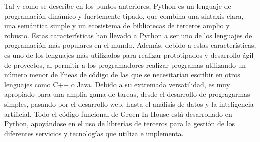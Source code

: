 Tal y como se describe en los puntos anteriores, Python es un lenguaje de programación dinámico y fuertemente tipado, que combina una sintaxis clara, una semántica simple y un ecosistema de bibliotecas de terceros amplio y robusto. Estas características han llevado a Python a ser uno de los lenguajes de programación más populares en el mundo. Además, debido a estas características, es uno de los lenguajes más utilizados para realizar prototipados y desarrollo ágil de proyectos, al permitir a los programadores realizar programas utilizando un número menor de líneas de código de las que se necesitarían escribir en otros lenguajes como C++ o Java. Debido a su extremada versatilidad, es muy apropiado para una amplia gama de tareas, desde el desarrollo de progragarmas simples, pasando por el desarrollo web, hasta el análisis de datos y la inteligencia artificial.
Todo el código funcional de Green In House está desarrollado en Python, apoyándose en el uso de librerías de terceros para la gestión de los diferentes servicios y tecnologías que utiliza e implementa.

